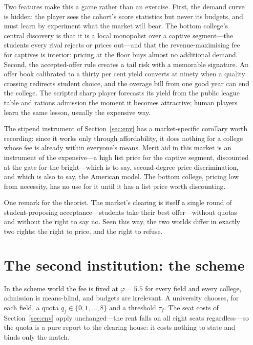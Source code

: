 \documentclass[11pt,a4paper]{article}
\begin{document}
Two features make this a game rather than an exercise. First, the demand curve is hidden: the player sees the cohort's score statistics but never its budgets, and must learn by experiment what the market will bear. The bottom college's central discovery is that it is a local monopolist over a captive segment---the students every rival rejects or prices out---and that the revenue-maximising fee for captives is interior: pricing at the floor buys almost no additional demand. Second, the accepted-offer rule creates a tail risk with a memorable signature. An offer book calibrated to a thirty per cent yield converts at ninety when a quality crossing redirects student choice, and the overage bill from one good year can end the college. The scripted sharp player forecasts its yield from the public league table and rations admission the moment it becomes attractive; human players learn the same lesson, usually the expensive way.

The stipend instrument of Section~\ref{sec:env} has a market-specific corollary worth recording: since it works only through affordability, it does nothing for a college whose fee is already within everyone's means. Merit aid in this market is an instrument of the expensive---a high list price for the captive segment, discounted at the gate for the bright---which is to say, second-degree price discrimination, and which is also to say, the American model. The bottom college, pricing low from necessity, has no use for it until it has a list price worth discounting.

One remark for the theorist. The market's clearing is itself a single round of student-proposing acceptance---students take their best offer---without quotas and without the right to say no. Seen this way, the two worlds differ in exactly two rights: the right to price, and the right to refuse.

\section{The second institution: the scheme}\label{sec:scheme}

In the scheme world the fee is fixed at $\bar{\varphi} = 5.5$ for every field and every college, admission is means-blind, and budgets are irrelevant. A university chooses, for each field, a quota $q_f \in \{0, 1, \ldots, 8\}$ and a threshold $\tau_f$. The seat costs of Section~\ref{sec:env} apply unchanged---the rent falls on all eight seats regardless---so the quota is a pure report to the clearing house: it costs nothing to state and binds only the match.
\end{document}
